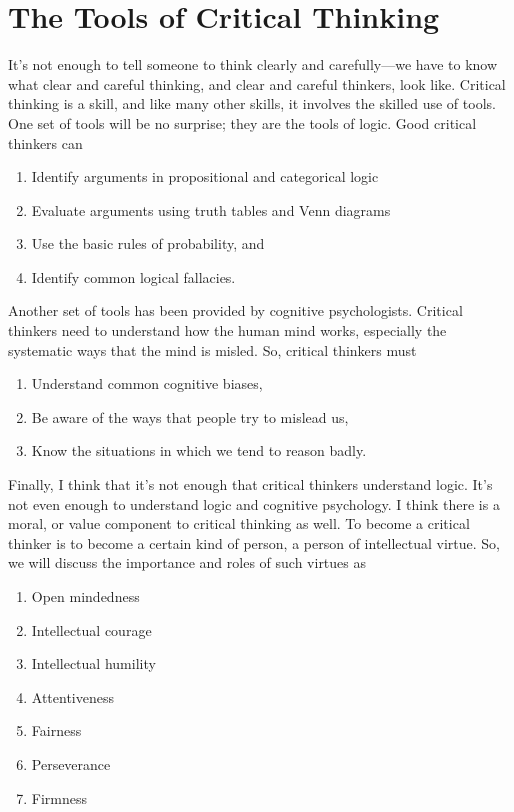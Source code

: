 \section{The Tools of Critical Thinking}
\label{sec:tools-ct}

It's not enough to tell someone to think clearly and carefully---we have
to know what clear and careful thinking, and clear and careful thinkers,
look like. Critical thinking is a skill, and like many other skills, it
involves the skilled use of tools. One set of tools will be no surprise;
they are the tools of logic. Good critical thinkers can

\begin{enumerate}

\item   Identify arguments in propositional and categorical logic
\item   Evaluate arguments using truth tables and Venn diagrams
\item   Use the basic rules of probability, and
\item   Identify common logical fallacies.
\end{enumerate}

Another set of tools has been provided by cognitive psychologists.
Critical thinkers need to understand how the human mind works,
especially the systematic ways that the mind is misled. So, critical
thinkers must

\begin{enumerate}
\item   Understand common cognitive biases,
\item   Be aware of the ways that people try to mislead us,
\item   Know the situations in which we tend to reason badly.
\end{enumerate}

Finally, I think that it's not enough that critical thinkers understand
logic. It's not even enough to understand logic and cognitive
psychology. I think there is a moral, or value component to critical
thinking as well. To become a critical thinker is to become a certain  kind of person, a person of  intellectual virtue. So, we will
discuss the importance and roles of such virtues as

\begin{enumerate}
\item   Open mindedness
\item   Intellectual courage
\item   Intellectual humility
\item   Attentiveness
\item   Fairness
\item   Perseverance
\item   Firmness
\end{enumerate}

